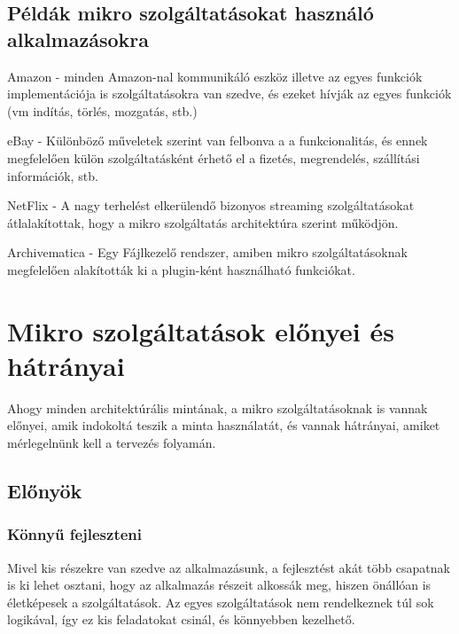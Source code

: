 \documentclass[11pt,magyar,a4paper,oneside,]{report}
\begin{document}
\section{Példák mikro szolgáltatásokat használó
alkalmazásokra}\label{puxe9lduxe1k-mikro-szolguxe1ltatuxe1sokat-hasznuxe1luxf3-alkalmazuxe1sokra}

Amazon - minden Amazon-nal kommunikáló eszköz illetve az egyes funkciók
implementációja is szolgáltatásokra van szedve, és ezeket hívják az
egyes funkciók (vm indítás, törlés, mozgatás, stb.)

eBay - Különböző műveletek szerint van felbonva a a funkcionalitás, és
ennek megfelelően külön szolgáltatásként érhető el a fizetés,
megrendelés, szállítási információk, stb.

NetFlix - A nagy terhelést elkerülendő bizonyos streaming
szolgáltatásokat átlalakítottak, hogy a mikro szolgáltatás architektúra
szerint működjön.

Archivematica\citep{archivematica} - Egy Fájlkezelő rendszer, amiben
mikro szolgáltatásoknak megfelelően alakították ki a plugin-ként
használható funkciókat.

\chapter{Mikro szolgáltatások előnyei és
hátrányai}\label{mikro-szolguxe1ltatuxe1sok-elux151nyei-uxe9s-huxe1truxe1nyai}

Ahogy minden architektúrális mintának, a mikro szolgáltatásoknak is
vannak előnyei, amik indokoltá teszik a minta használatát, és vannak
hátrányai, amiket mérlegelnünk kell a tervezés folyamán.

\section{\texorpdfstring{Előnyök
\citep{microservices}}{Előnyök {[}@microservices{]}}}\label{elux151nyuxf6k-microservices}

\subsection{Könnyű fejleszteni}\label{kuxf6nnyux171-fejleszteni}

Mivel kis részekre van szedve az alkalmazásunk, a fejlesztést akát több
csapatnak is ki lehet osztani, hogy az alkalmazás részeit alkossák meg,
hiszen önállóan is életképesek a szolgáltatások. Az egyes szolgáltatások
nem rendelkeznek túl sok logikával, így ez kis feladatokat csinál, és
könnyebben kezelhető.
\end{document}
